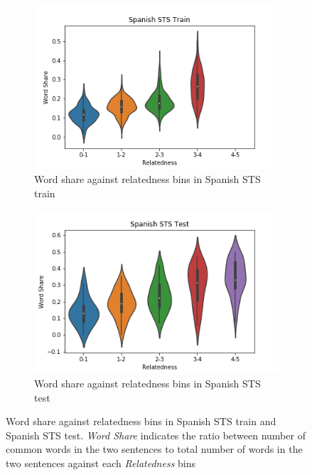 \begin{enumerate}
\begin{figure}
	\captionsetup[subfigure]{justification=centering}
	\centering
	\begin{subfigure}[b]{.5\textwidth}
		\centering
		\includegraphics[width=\textwidth]{figures/semantic_textual_similarity/introduction/spanish_sts_train_word_share.png}
		\caption{Word share against relatedness bins in Spanish STS train}
		\label{fig:spanish_sts_train_word_share}
	\end{subfigure}%
	\begin{subfigure}[b]{.5\textwidth}
		\centering
		\includegraphics[width=\textwidth]{figures/semantic_textual_similarity/introduction/spanish_sts_test_word_share.png}
		\caption{Word share against relatedness bins in Spanish STS test}
		\label{fig:spanish_sts_test_word_share}
	\end{subfigure}
	\caption[Word share against relatedness bins in Spanish STS train and STS 2017 test.]{Word share against relatedness bins in Spanish STS train and Spanish STS test. \textit{Word Share} indicates the ratio between number of common words in the two sentences to total number of words in the two sentences against each \textit{Relatedness} bins}
	\label{fig:spanish_sts_word_share}
\end{figure}



\end{enumerate}
